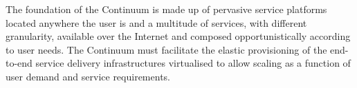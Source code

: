 
The foundation of the Continuum is made up of pervasive service platforms located anywhere the user is and a multitude of services, with different granularity, available over the Internet and composed opportunistically according to user needs.
The Continuum must facilitate the elastic provisioning of the end-to-end service delivery infrastructures virtualised to allow scaling as a function of user demand and service requirements. 



